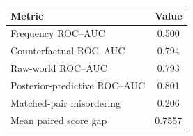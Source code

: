 \begin{tabular}{lc}
\toprule
Metric & Value \\
\midrule
Frequency ROC--AUC & 0.500 \\
Counterfactual ROC--AUC & 0.794 \\
Raw-world ROC--AUC & 0.793 \\
Posterior-predictive ROC--AUC & 0.801 \\
Matched-pair misordering & 0.206 \\
Mean paired score gap & 0.7557 \\
\bottomrule
\end{tabular}
